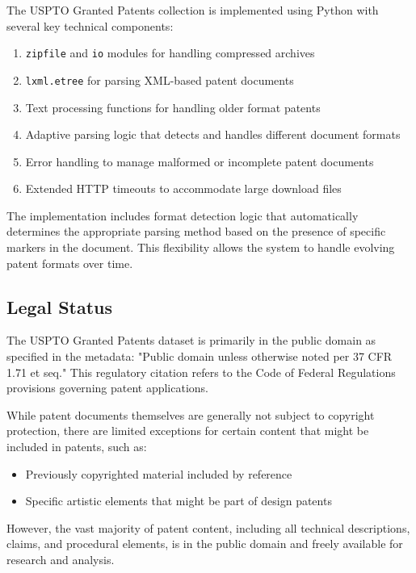 The USPTO Granted Patents collection is implemented using Python with several key technical components:

\begin{enumerate}
    \item \texttt{zipfile} and \texttt{io} modules for handling compressed archives
    \item \texttt{lxml.etree} for parsing XML-based patent documents
    \item Text processing functions for handling older format patents
    \item Adaptive parsing logic that detects and handles different document formats
    \item Error handling to manage malformed or incomplete patent documents
    \item Extended HTTP timeouts to accommodate large download files
\end{enumerate}

The implementation includes format detection logic that automatically determines the appropriate parsing method based on the presence of specific markers in the document. This flexibility allows the system to handle evolving patent formats over time.

\subsection{Legal Status}

The USPTO Granted Patents dataset is primarily in the public domain as specified in the metadata: "Public domain unless otherwise noted per 37 CFR 1.71 et seq." This regulatory citation refers to the Code of Federal Regulations provisions governing patent applications.

While patent documents themselves are generally not subject to copyright protection, there are limited exceptions for certain content that might be included in patents, such as:

\begin{itemize}
    \item Previously copyrighted material included by reference
    \item Specific artistic elements that might be part of design patents
\end{itemize}

However, the vast majority of patent content, including all technical descriptions, claims, and procedural elements, is in the public domain and freely available for research and analysis.

